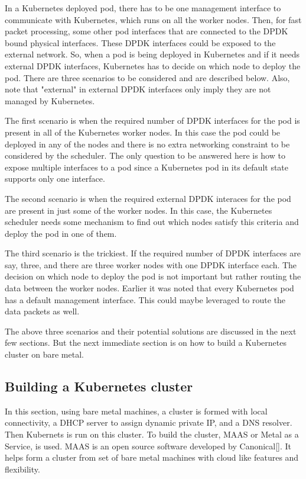 \documentclass[english, 12pt, a4paper, elec, utf8, a-1b, online]{aaltothesis}
\begin{document}
In a Kubernetes deployed pod, there has to be one management interface to communicate with Kubernetes, which runs on all the worker nodes. Then, for fast packet processing, some other pod interfaces that are connected to the DPDK bound physical interfaces. These DPDK interfaces could be exposed to the external network. So, when a pod is being deployed in Kubernetes and if it needs external DPDK interfaces, Kubernetes has to decide on which node to deploy the pod. There are three scenarios to be considered and are described below. Also, note that "external" in external DPDK interfaces only imply they are not managed by Kubernetes.

The first scenario is when the required number of DPDK interfaces for the pod is present in all of the Kubernetes worker nodes. In this case the pod could be deployed in any of the nodes and there is no extra networking constraint to be considered by the scheduler. The only question to be answered here is how to expose multiple interfaces to a pod since a Kubernetes pod in its default state supports only one interface.

The second scenario is when the required external DPDK interaces for the pod are present in just some of the worker nodes. In this case, the Kubernetes scheduler needs some mechanism to find out which nodes satisfy this criteria and deploy the pod in one of them.

The third scenario is the trickiest. If the required number of DPDK interfaces are say, three, and there are three worker nodes with one DPDK interface each. The decision on which node to deploy the pod is not important but rather routing the data between the worker nodes. Earlier it was noted that every Kubernetes pod has a default management interface. This could maybe leveraged to route the data packets as well.

The above three scenarios and their potential solutions are discussed in the next few sections. But the next immediate section is on how to build a Kubernetes cluster on bare metal.

\subsection{Building a Kubernetes cluster}
In this section, using bare metal machines, a cluster is formed with local connectivity, a DHCP server to assign dynamic private IP, and a DNS resolver. Then Kubernets is run on this cluster. To build the cluster, MAAS or Metal as a Service, is used. MAAS is an open source software developed by Canonical[]. It helps form a cluster from set of bare metal machines with cloud like features and flexibility.
\end{document}
